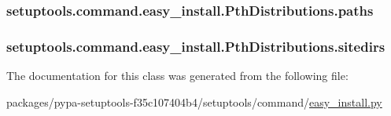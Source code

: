 \subsubsection[{paths}]{\setlength{\rightskip}{0pt plus 5cm}setuptools.\+command.\+easy\+\_\+install.\+Pth\+Distributions.\+paths}\label{classsetuptools_1_1command_1_1easy__install_1_1PthDistributions_aaeff84e1e64e746b8f64c993a7b23c4d}
\hypertarget{classsetuptools_1_1command_1_1easy__install_1_1PthDistributions_a23bbbd0c5ba2b4108d346559451b5788}{}
\subsubsection[{sitedirs}]{\setlength{\rightskip}{0pt plus 5cm}setuptools.\+command.\+easy\+\_\+install.\+Pth\+Distributions.\+sitedirs}\label{classsetuptools_1_1command_1_1easy__install_1_1PthDistributions_a23bbbd0c5ba2b4108d346559451b5788}


The documentation for this class was generated from the following file\+:\begin{DoxyCompactItemize}
\item 
packages/pypa-\/setuptools-\/f35c107404b4/setuptools/command/\hyperlink{setuptools_2command_2easy__install_8py}{easy\+\_\+install.\+py}\end{DoxyCompactItemize}
